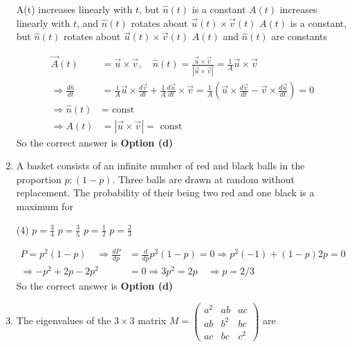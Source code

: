 \begin{enumerate}
\begin{tasks}
	\task[\textbf{a.}] A(t) increases linearly with $t$, but $\hat{n}(t)$ is a constant
	\task[\textbf{b.}] $A(t)$ increases linearly with $t$, and $\hat{n}(t)$ rotates about $\vec{u}(t) \times \vec{v}(t)$
	\task[\textbf{c.}]$A(t)$ is a constant, but $\hat{n}(t)$ rotates about $\vec{u}(t) \times \vec{v}(t)$
	\task[\textbf{d.}] $A(t)$ and $\hat{n}(t)$ are constants
\end{tasks}
\begin{answer}
	\begin{align*}
	 \vec{A}(t)&=\vec{u} \times \vec{v}, \quad \hat{n}(t)=\frac{\vec{u} \times \vec{v}}{|\vec{u} \times \vec{v}|}=\frac{1}{A} \vec{u} \times \vec{v}\\
	\Rightarrow \frac{d \hat{n}}{d t}&=\frac{1}{A} \vec{u} \times \frac{d \vec{v}}{d t}+\frac{1}{A} \frac{d \vec{u}}{d t} \times \vec{v}=\frac{1}{A}\left(\vec{u} \times \frac{d \vec{v}}{d t}-\vec{v} \times \frac{d \vec{u}}{d t}\right)=0 \\
	\Rightarrow \hat{n}(t)&=\text { const } \\
	\Rightarrow A(t)&=|\vec{u} \times \vec{v}|=\text { const }
	\end{align*}
		So the correct answer is \textbf{Option (d)}
\end{answer}
\item A basket consists of an infinite number of red and black balls in the proportion $p:(1-p)$. Three balls are drawn at random without replacement. The probability of their being two red and one black is a maximum for
 \begin{tasks}(4)
	\task[\textbf{a.}]$p=\frac{3}{4}$
	\task[\textbf{b.}]$p=\frac{3}{5}$
	\task[\textbf{c.}] $p=\frac{1}{2}$
	\task[\textbf{d.}] $p=\frac{2}{3}$ 
\end{tasks}
\begin{answer}
	\begin{align*}
	P=p^{2}(1-p) \quad \Rightarrow \frac{d P}{d p}&=\frac{d}{d p} p^{2}(1-p)=0 \Rightarrow p^{2}(-1)+(1-p) 2 p=0\\
	\Rightarrow-p^{2}+2 p-2 p^{2}&=0 \Rightarrow 3 p^{2}=2 p \quad \Rightarrow p=2 / 3
	\end{align*}
	So the correct answer is \textbf{Option (d)}
\end{answer}
\item The eigenvalues of the $3 \times 3$ matrix $M=\left(\begin{array}{lll}a^{2} & a b & a c \\ a b & b^{2} & b c \\ a c & b c & c^{2}\end{array}\right)$ are

\end{enumerate}
